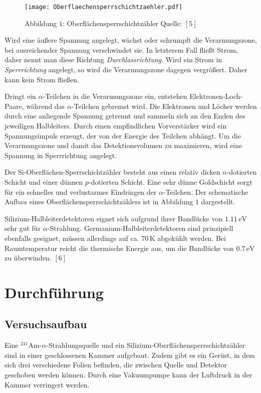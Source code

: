 \documentclass[12pt,a4paper]{scrartcl}
\numberwithin{equation}{section} %
\renewcommand{\[}{} %
\renewcommand{\]}{\noindent} %
\begin{document}
\begin{figure}
\centering
\texttt{[image: Oberflaechensperrschichtzaehler.pdf]}
\caption{Abbildung \(1\): Oberflächensperrschichtzähler Quelle: \([5]\)}
\end{figure}

Wird eine äußere Spannung angelegt, wächst oder schrumpft die
Verarmungszone, bei ausreichender Spannung verschwindet sie. In
letzterem Fall fließt Strom, daher nennt man diese Richtung
\emph{Durchlassrichtung}. Wird ein Strom in \emph{Sperrrichtung}
angelegt, so wird die Verarmungszone dagegen vergrößert. Daher kann kein
Strom fließen.

Dringt ein \(\alpha\)-Teilchen in die Verarmungszone ein, entstehen
Elektronen-Loch-Paare, während das \(\alpha\)-Teilchen gebremst wird.
Die Elektronen und Löcher werden durch eine anliegende Spannung getrennt
und sammeln sich an den Enden des jeweiligen Halbleiters. Durch einen
empfindlichen Vorverstärker wird ein Spannungsimpuls erzeugt, der von
der Energie des Teilchen abhängt. Um die Verarmungszone und damit das
Detektionsvolumen zu maximieren, wird eine Spannung in Sperrrichtung
angelegt.

Der \(\mathrm{Si}\)-Oberflächen-Sperrschichtzähler besteht aus einen
relativ dicken \(n\)-dotierten Schicht und einer dünnen \(p\)-dotierten
Schicht. Eine sehr dünne Goldschicht sorgt für ein schnelles und
verlustarmes Eindringen der \(\alpha\)-Teilchen. Der schematische Aufbau
eines Oberflächensperrschichtzählers ist in Abbildung \(1\) dargestellt.

Silizium-Halbleiterdetektoren eignet sich aufgrund ihrer Bandlücke von
\(1.11\mathrm{\,eV}\) sehr gut für \(\alpha\)-Strahlung.
Germanium-Halbleiterdetektoren sind prinzipiell ebenfalls geeignet,
müssen allerdings auf ca. \(70\,\mathrm K\) abgekühlt werden. Bei
Raumtemperatur reicht die thermische Energie aus, um die Bandlücke von
\(0.7\mathrm{\,eV}\) zu überwinden. \([6]\)

\hypertarget{durchfuxfchrung}{%
\section{Durchführung}\label{durchfuxfchrung}}

\hypertarget{versuchsaufbau}{%
\subsection{Versuchsaufbau}\label{versuchsaufbau}}

Eine \(^{241}\mathrm{Am}\)-\(\alpha\)-Strahlungsquelle und ein
Silizium-Oberflächensperrschichtzähler sind in einer geschlossenen
Kammer aufgebaut. Zudem gibt es ein Gerüst, in dem sich drei
verschiedene Folien befinden, die zwischen Quelle und Detektor geschoben
werden können. Durch eine Vakuumpumpe kann der Luftdruck in der Kammer
verringert werden.
\end{document}
